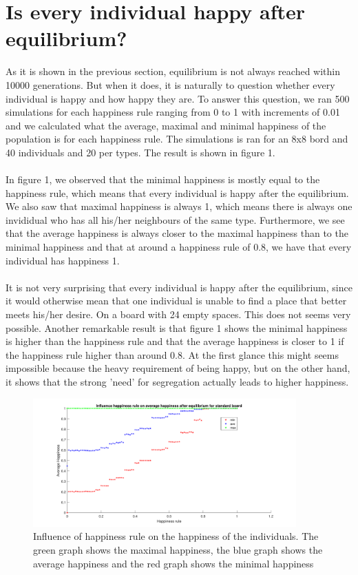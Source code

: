\documentclass{article}
\begin{document}
\section{Is every individual happy after equilibrium?}
As it is shown in the previous section, equilibrium is not always reached within 10000 generations. But when it does, it is naturally to question whether every individual is happy and how happy they are. To answer this question, we ran 500 simulations for each happiness rule ranging from 0 to 1 with increments of 0.01 and we calculated what the average, maximal and minimal happiness of the population is for each happiness rule. The simulations is ran for an 8x8 bord and 40 individuals and 20 per types. The result is shown in figure 1.\\
\\
In figure 1, we observed that the minimal happiness is mostly equal to the happiness rule, which means that every individual is happy after the equilibrium. We also saw that maximal happiness is always 1, which means there is always one invididual who has all his/her neighbours of the same type. Furthermore, we see that the average happiness is always closer to the maximal happiness than to the minimal happiness and that at around a happiness rule of 0.8, we have that every individual has happiness 1.\\
\\
It is not very surprising that every individual is happy after the equilibrium, since it would otherwise mean that one individual is unable to find a place that better meets his/her desire. On a board with 24 empty spaces. This does not seems very possible. Another remarkable result is that figure 1 shows the minimal happiness is higher than the happiness rule and that the average happiness is closer to 1 if the happiness rule higher than around 0.8. At the first glance this might seems impossible because the heavy requirement of being happy, but on the other hand, it shows that the strong 'need' for segregation actually leads to higher happiness.
\begin{figure}[h!]
    \centering
    \includegraphics[width=0.9\textwidth]{happinessregel-gemhappinesseind-2}
    \caption{Influence of happiness rule on the happiness of the individuals. The green graph shows the maximal happiness, the blue graph shows the average happiness and the red graph shows the minimal happiness}
\end{figure}
\end{document}
